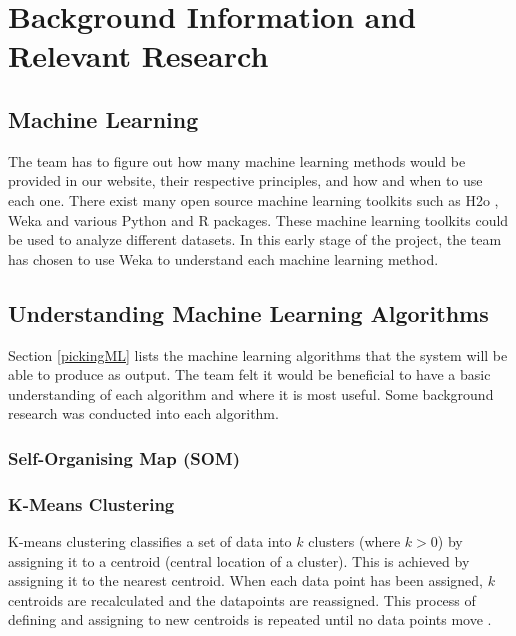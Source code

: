 \documentclass[a4paper,titlepage]{article}
\begin{document}
\section{Background Information and \\Relevant Research}
\subsection{Machine Learning}
The team has to figure out how many machine learning methods would be provided in our website, their respective principles, and how and when to use each one.
There exist many open source machine learning toolkits such as H2o \cite{h2o.ai}, Weka \cite{weka} and various Python and R packages. 
These machine learning toolkits could be used to analyze different datasets. 
In this early stage of the project, the team has chosen to use Weka to understand each machine learning method.

\subsection{Understanding Machine Learning Algorithms}
Section \ref{pickingML} lists the machine learning algorithms that the system will be able to produce as output. 
The team felt it would be beneficial to have a basic understanding of each algorithm and where it is most useful. 
Some background research was conducted into each algorithm.

\subsubsection*{Self-Organising Map (SOM)}
\subsubsection*{K-Means Clustering}
K-means clustering classifies a set of data into $k$ clusters (where $k > 0$) by assigning it to a centroid (central location of a cluster). 
This is achieved by assigning it to the nearest centroid. 
When each data point has been assigned, $k$ centroids are recalculated and the datapoints are reassigned. 
This process of defining and assigning to new centroids is repeated until no data points move \cite{kmeans}.
\end{document}
